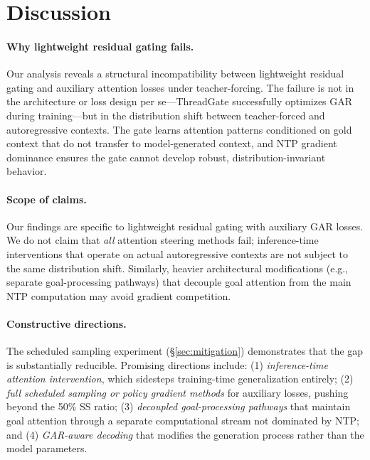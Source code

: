 \documentclass[11pt]{article}
\begin{document}
\section{Discussion}
\label{sec:discussion}

\paragraph{Why lightweight residual gating fails.}
Our analysis reveals a structural incompatibility between lightweight residual gating and auxiliary attention losses under teacher-forcing. The failure is not in the architecture or loss design per se---ThreadGate successfully optimizes GAR during training---but in the distribution shift between teacher-forced and autoregressive contexts. The gate learns attention patterns conditioned on gold context that do not transfer to model-generated context, and NTP gradient dominance ensures the gate cannot develop robust, distribution-invariant behavior.

\paragraph{Scope of claims.}
Our findings are specific to lightweight residual gating with auxiliary GAR losses. We do not claim that \emph{all} attention steering methods fail; inference-time interventions \citep{li2024inference, meng2022locating} that operate on actual autoregressive contexts are not subject to the same distribution shift. Similarly, heavier architectural modifications (e.g., separate goal-processing pathways) that decouple goal attention from the main NTP computation may avoid gradient competition.

\paragraph{Constructive directions.}
The scheduled sampling experiment (\S\ref{sec:mitigation}) demonstrates that the gap is substantially reducible. Promising directions include: (1) \emph{inference-time attention intervention}, which sidesteps training-time generalization entirely; (2) \emph{full scheduled sampling or policy gradient methods} for auxiliary losses, pushing beyond the 50\% SS ratio; (3) \emph{decoupled goal-processing pathways} that maintain goal attention through a separate computational stream not dominated by NTP; and (4) \emph{GAR-aware decoding} that modifies the generation process rather than the model parameters.
\end{document}
